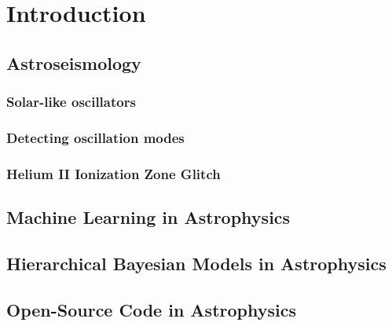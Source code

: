 \chapter{Introduction}

\section{Astroseismology}

\subsection{Solar-like oscillators}

\subsection{Detecting oscillation modes}

\subsection{Helium II Ionization Zone Glitch}

\section{Machine Learning in Astrophysics}

\section{Hierarchical Bayesian Models in Astrophysics}

\section{Open-Source Code in Astrophysics}
